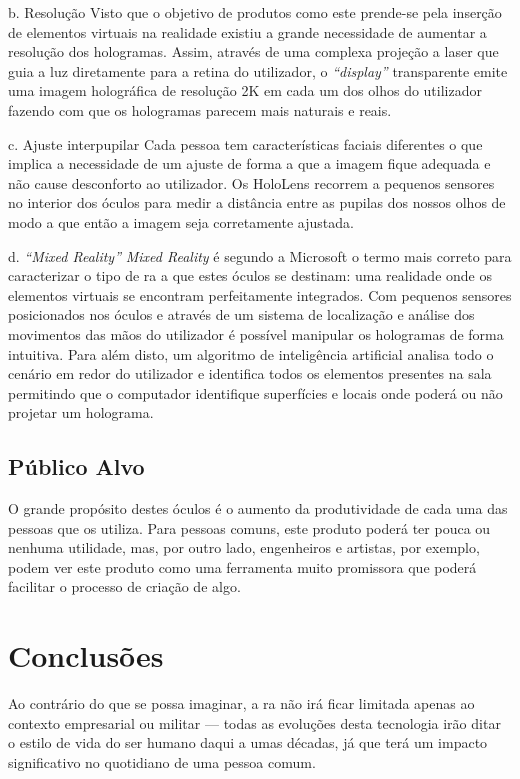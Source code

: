 \documentclass{report}
\begin{document}
b. Resolução
Visto que o objetivo de produtos como este prende-se pela inserção de elementos virtuais na realidade existiu a grande necessidade de aumentar a resolução dos hologramas. Assim, através de uma complexa projeção a laser que guia a luz diretamente para a retina do utilizador, o \textit{“display”} transparente emite uma imagem holográfica de resolução 2K em cada um dos olhos do utilizador fazendo com que os hologramas parecem mais naturais e reais.

c. Ajuste interpupilar
Cada pessoa tem características faciais diferentes o que implica a necessidade de um ajuste de forma a que a imagem fique adequada e não cause desconforto ao utilizador. Os HoloLens recorrem a pequenos sensores no interior dos óculos para medir a distância entre as pupilas dos nossos olhos de modo a que então a imagem seja corretamente ajustada.

d. \textit{“Mixed Reality”}
\textit{Mixed Reality} é segundo a Microsoft o termo mais correto para caracterizar o tipo de \ac{ra} a que estes óculos se destinam: uma realidade onde os elementos virtuais se encontram perfeitamente integrados. Com pequenos sensores posicionados nos óculos e através de um sistema de localização e análise dos movimentos das mãos do utilizador é possível manipular os hologramas de forma intuitiva. Para além disto, um algoritmo de inteligência artificial analisa todo o cenário em redor do utilizador e identifica todos os elementos presentes na sala permitindo que o computador identifique superfícies e locais onde poderá ou não projetar um holograma.


\section{Público Alvo}
O grande propósito destes óculos é o aumento da produtividade de cada uma das pessoas que os utiliza.
Para pessoas comuns, este produto poderá ter pouca ou nenhuma utilidade, mas, por outro lado, engenheiros e artistas, por exemplo, podem ver este produto como uma ferramenta muito promissora que poderá facilitar o processo de criação de algo.

\chapter{Conclusões}
\label{chap.conclusao}

Ao contrário do que se possa imaginar, a \ac{ra} não irá ficar limitada apenas ao contexto empresarial ou militar — todas as evoluções desta tecnologia irão ditar o estilo de vida do ser humano daqui a umas décadas, já que terá um impacto significativo no quotidiano de uma pessoa comum.
\end{document}
